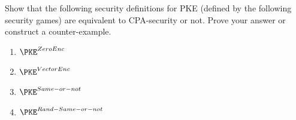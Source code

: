 \begin{problem}\label{p3}
    \leavevmode\par
    Show that the following security definitions for PKE (defined by the following security games) are equivalent to CPA-security or not. Prove your answer or construct a counter-example.
    \begin{enumerate}[label=(\roman*)]
        \item $\PKE^{ZeroEnc}$
        \item $\PKE^{VectorEnc}$
        \item $\PKE^{Same-or-not}$
        \item $\PKE^{Rand-Same-or-not}$
    \end{enumerate}
\end{problem}


